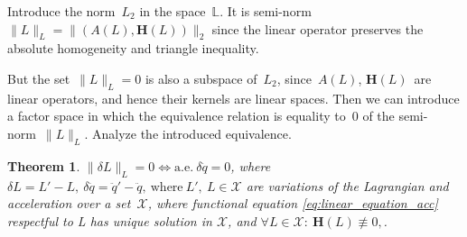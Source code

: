 \documentclass[sn-mathphys-num]{sn-jnl}
\theoremstyle{thmstylethree}
\theoremstyle{thmstyletwo}
\theoremstyle{thmstyleone}
\newtheorem{theorem}{Theorem}
\begin{document}
Introduce the norm~$L_2$ in the space~$\mathbb{L}$. It is semi-norm $\|L\|_L = \|(A(L), \mathbf{H}(L))\|_2$ since the linear operator preserves the absolute homogeneity and triangle inequality.

But the set~$\|L\|_L = 0$ is also a subspace of~$L_2$, since~$A(L)$, $\mathbf{H}(L)$~are linear operators, and hence their kernels are linear spaces. Then we can introduce a factor space in which the
equivalence relation is equality to~$0$ of the semi-norm~$\|L\|_L$. Analyze the introduced equivalence.
\begin{theorem}
    
\label{lemmaeq}
$\|\delta L\|_L = 0 \Leftrightarrow \text{a.e.}~\delta \ddot{q} = 0$, where $\delta L = L' - L, ~\delta \ddot{q} = \ddot{q}' - \ddot{q}, ~\text{where} \ L',\ L \in \mathcal {X}$ are variations of the Lagrangian and acceleration over a set~$\mathcal {X}$, where functional equation \ref{eq:linear_equation_acc} respectful to L has unique solution in $\mathcal{X}$, and $\forall L\in \mathcal{X}:~\mathbf{H}(L) \not\equiv 0, $.
\end{theorem} 
\end{document}
